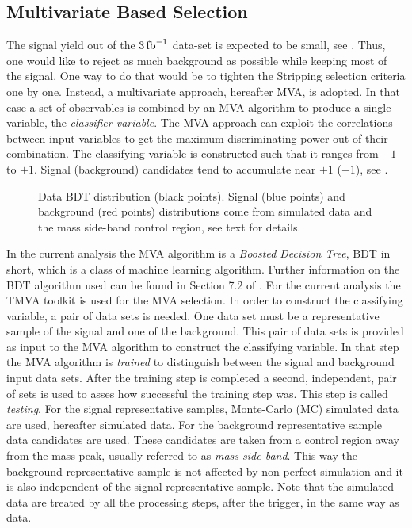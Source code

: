 \subsection{Multivariate Based Selection}
\label{Multivariate_Based_Selection}

The \BsJpsiKst signal yield out of the $3 \mbox{\,fb}^{-1}$ data-set is expected to be small, see . Thus, one would like to
reject as much background as possible while keeping most of the signal. One way to do that would be to tighten the Stripping
selection criteria one by one. Instead, a multivariate approach, hereafter MVA, is adopted.
In that case a set of observables is combined by an MVA algorithm to produce a single variable, the {\it classifier variable}.
The MVA approach can exploit the correlations between input variables to get the maximum discriminating power out of their combination.
The classifying variable is constructed such that it ranges from $-1$ to $+1$. Signal (background) candidates tend to
accumulate near $+1$ ($-1$), see .

\begin{figure}[!t]
\centering
  \scalebox{1}{}
  \caption{Data BDT distribution (black points). Signal (blue points) and background (red points) distributions
           come from simulated data and the \Bs mass side-band control region, see text for details.}
  \label{BTDG_performance}
\end{figure}

In the current analysis the MVA algorithm is a {\it Boosted Decision Tree}, BDT in short, which is a class
of machine learning  algorithm. Further information on the BDT algorithm used can be found in Section 7.2 of \cite{TMVA}.
For the current analysis the TMVA toolkit \cite{TMVA} is used for the MVA selection. In order to construct the classifying variable,
a pair of data sets is needed. One data set must be a representative sample of the signal and one of the background.
This pair of data sets is provided as input to the MVA algorithm to construct the classifying variable.
In that step the MVA algorithm is {\it trained} to distinguish between the signal and background input data sets.
After the training step is completed a second, independent, pair of sets is used to asses how
successful the training step was. This step is called {\it testing}.
For the signal representative samples, \BsJpsiKst Monte-Carlo (MC) simulated data are used, hereafter simulated data.
For the background representative sample data candidates are used. These candidates are taken from a control
region away from the \BsJpsiKst mass peak, usually referred to as {\it mass side-band}. This way the background representative sample
is not affected by non-perfect simulation and it is also independent of the signal representative sample.
Note that the simulated data are treated by all the processing steps, after the \lzero trigger, in the same way as data.


